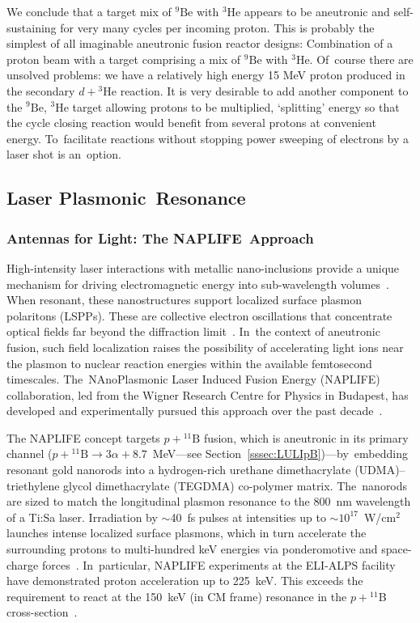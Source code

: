 \documentclass[particles,article,accept,pdftex,moreauthors]{Definitions/mdpi}
\begin{document}
We conclude that a target mix of ${}^9\mathrm{Be}$ with ${}^{3}\mathrm{He}$ appears to be aneutronic and self-sustaining for very many cycles per incoming proton. This is probably the simplest of all imaginable aneutronic fusion reactor designs: Combination of a proton beam with a target comprising a mix of ${}^9\mathrm{Be}$ with ${}^{3}\mathrm{He}$. Of~course there are unsolved problems: we have a relatively high energy 15 MeV proton produced in the secondary $d+{}^{3}\mathrm{He}$ reaction. It is very desirable to add another component to the ${}^9\mathrm{Be}$, ${}^{3}\mathrm{He}$ target allowing protons to be multiplied, `splitting' energy so that the cycle closing reaction would benefit from several protons at convenient energy. To~facilitate reactions without stopping power sweeping of electrons by a laser shot is an~option.
 
\subsection{Laser Plasmonic~Resonance}\label{ssec:Plasmonics}
\subsubsection{Antennas for Light: The NAPLIFE~Approach}\label{sssec:Anten}
High-intensity laser interactions with metallic nano-inclusions provide a unique mechanism for driving electromagnetic energy into sub-wavelength volumes~\cite{kroo2016plasmonic}. When resonant, these nanostructures support localized surface plasmon polaritons (LSPPs). These are collective electron oscillations that concentrate optical fields far beyond the diffraction limit~\cite{Schuck:2005,Novotny:2007,Novotny:2011}. In~the context of aneutronic fusion, such field localization raises the possibility of accelerating light ions near the plasmon to nuclear reaction energies within the available femtosecond timescales. The~NAnoPlasmonic Laser Induced Fusion Energy (NAPLIFE) collaboration, led from the Wigner Research Centre for Physics in Budapest, has developed and experimentally pursued this approach over the past decade~\cite{Biro:2025EPJ,Csernai:2025EPJ,tamas2025nanofusion}.

The NAPLIFE concept targets $p+{}^{11}\mathrm{B}$ fusion, which is aneutronic in its primary channel ($p+{}^{11}\mathrm{B}\to 3\alpha + 8.7$~MeV---see Section~\ref{sssec:LULIpB})---by~embedding resonant gold nanorods into a hydrogen-rich urethane dimethacrylate (UDMA)--triethylene glycol dimethacrylate (TEGDMA) co-polymer matrix. The~nanorods are sized to match the longitudinal plasmon resonance to the 800~nm wavelength of a Ti:Sa laser. Irradiation by $\sim$40~fs pulses at intensities up to ${\sim}10^{17}$~W/cm${}^2$ launches intense localized surface plasmons, which in turn accelerate the surrounding protons to multi-hundred keV energies via ponderomotive and space-charge forces~\cite{Papp:2022PRXEnergy,Papp:2023FrontPhys}. In~particular, NAPLIFE experiments at the ELI-ALPS facility have demonstrated proton acceleration up to 225~keV. This exceeds the requirement to react at the 150~keV (in CM frame) resonance in the $p+{}^{11}$B cross-section~\cite{Kroo2024pB,Kedves:2025EPJ}.
\end{document}
